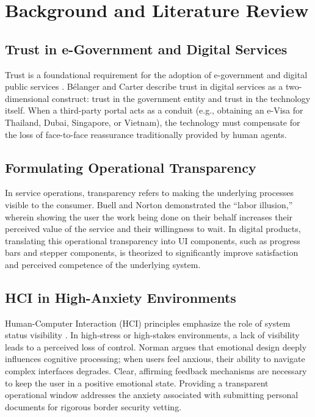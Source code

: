 \documentclass[journal, 10pt, twoside]{IEEEtran}
\begin{document}
\section{Background and Literature Review}
\label{sec:related_work}

\subsection{Trust in e-Government and Digital Services}
Trust is a foundational requirement for the adoption of e-government and digital public services \cite{carter2005}. Bélanger and Carter \cite{belanger2008} describe trust in digital services as a two-dimensional construct: trust in the government entity and trust in the technology itself. When a third-party portal acts as a conduit (e.g., obtaining an e-Visa for Thailand, Dubai, Singapore, or Vietnam), the technology must compensate for the loss of face-to-face reassurance traditionally provided by human agents.

\subsection{Formulating Operational Transparency}
In service operations, transparency refers to making the underlying processes visible to the consumer. Buell and Norton \cite{buell2011} demonstrated the ``labor illusion,'' wherein showing the user the work being done on their behalf increases their perceived value of the service and their willingness to wait. In digital products, translating this operational transparency into UI components, such as progress bars and stepper components, is theorized to significantly improve satisfaction and perceived competence of the underlying system.

\subsection{HCI in High-Anxiety Environments}
Human-Computer Interaction (HCI) principles emphasize the role of system status visibility \cite{nielsen1994}. In high-stress or high-stakes environments, a lack of visibility leads to a perceived loss of control. Norman \cite{norman2004} argues that emotional design deeply influences cognitive processing; when users feel anxious, their ability to navigate complex interfaces degrades. Clear, affirming feedback mechanisms are necessary to keep the user in a positive emotional state. Providing a transparent operational window addresses the anxiety associated with submitting personal documents for rigorous border security vetting.
\end{document}
